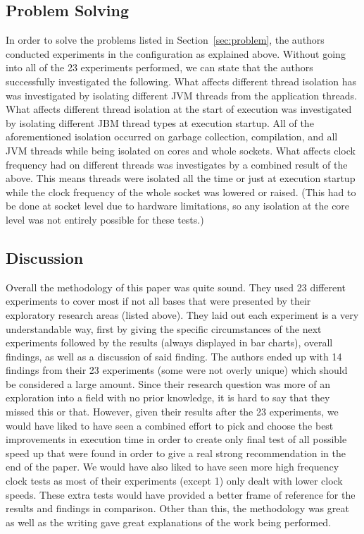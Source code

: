 \documentclass[conference]{IEEEtran}
\begin{document}
\subsection{Problem Solving}

In order to solve the problems listed in Section~\ref{sec:problem}, the authors
conducted experiments in the configuration as explained above. Without going into all of the 23
experiments performed, we can state that the authors successfully investigated the following.
What affects different thread isolation has was investigated by isolating different JVM threads
from the application threads. What affects different thread isolation at the start of execution
was investigated by isolating different JBM thread types at execution startup. All of the
aforementioned isolation occurred on garbage collection, compilation, and all JVM threads
while being isolated on cores and whole sockets. What affects clock frequency had on different
threads was investigates by a combined result of the above. This means threads were isolated all
the time or just at execution startup while the clock frequency of the whole socket was lowered
or raised. (This had to be done at socket level due to hardware limitations, so any isolation
at the core level was not entirely possible for these tests.) 

\subsection {Discussion}

Overall the methodology of this paper was quite sound. They used 23 different experiments to
cover most if not all bases that were presented by their exploratory research areas (listed above).
They laid out each experiment is a very understandable way, first by giving the specific circumstances
of the next experiments followed by the results (always displayed in bar charts), overall findings, as
well as a discussion of said finding. The authors ended up with 14 findings from their 23 experiments
(some were not overly unique) which should be considered a large amount. Since their research question
was more of an exploration into a field with no prior knowledge, it is hard to say that they missed
this or that. However, given their results after the 23 experiments, we would have liked to have seen
a combined effort to pick and choose the best improvements in execution time in order to create
only final test of all possible speed up that were found in order to give a real strong recommendation
in the end of the paper. We would have also liked to have seen more high frequency clock tests as most
of their experiments (except 1) only dealt with lower clock speeds. These extra tests would have 
provided a better frame of reference for the results and findings in comparison.
Other than this, the methodology was great as well as the writing gave great
explanations of the work being performed.
\end{document}
